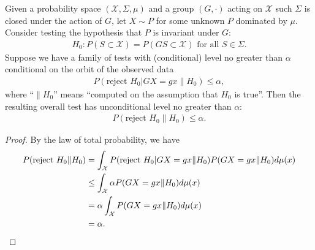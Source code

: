 \begin{thm}
Given a probability space $(\mathcal{X}, \Sigma, \mu)$ and a group $(G, \cdot)$
acting on $\mathcal{X}$ such  $\Sigma$ is closed under the action of $G$,  
let $X \sim P$ for some unknown $P$ dominated by $\mu$.
Consider testing the hypothesis that $P$ is invariant under $G$:
\begin{align*}
H_0: P(S \subset \mathcal{X}) = P(GS  \subset \mathcal{X}) \text{  for all }S \in \Sigma.
\end{align*}
Suppose we have a family of tests with (conditional) level no greater than $\alpha$ conditional on the orbit of
the observed data
\begin{align*}
P(\text{reject }H_0 | GX=gx \| H_0) \le \alpha,
\end{align*}
where ``$\| H_0$'' means ``computed on the assumption that $H_0$ is true''.
Then the resulting overall test has unconditional level no greater than $\alpha$:
\begin{align*}
P(\text{reject }H_0  \| H_0) \le \alpha.
\end{align*}
\end{thm}

\begin{proof}
By the law of total probability, we have
\begin{align*}
P(\text{reject }H_0  \| H_0) &= \int_\mathcal{X} P(\text{reject }H_0 | GX=gx \| H_0)P(GX=gx \| H_0)d\mu(x) \\
  &\le \int_\mathcal{X} \alpha P(GX=gx \| H_0)d\mu(x) \\
  &= \alpha \int_\mathcal{X} P(GX=gx \| H_0)d\mu(x) \\
  &= \alpha.  \qedhere
\end{align*}
\end{proof}
